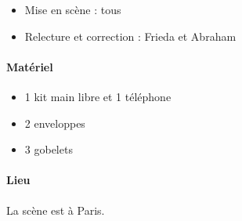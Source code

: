 	\begin{itemize}
	\item Mise en scène : tous
	\item Relecture et correction : Frieda et Abraham
	\end{itemize}
	
	\paragraph{Matériel}
	
	\begin{itemize}
	\item 1 kit main libre et 1 téléphone
	\item 2 enveloppes
	\item 3 gobelets
	\end{itemize}
	
	\paragraph{Lieu}
	
	La scène est à Paris.